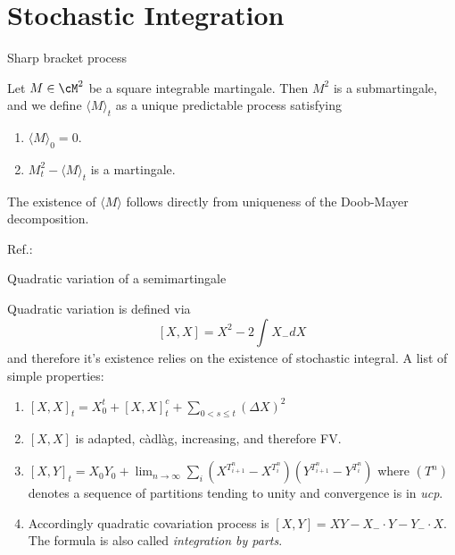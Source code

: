 

\section{Stochastic Integration}


\begin{frame}
    {Sharp bracket process}
    
    Let $M \in \cM^2$ be a square integrable martingale. Then $M^2$ is
    a submartingale, and we define $\langle M \rangle_t$ as a unique predictable
    process satisfying
    \begin{enumerate}
        \item $\langle M \rangle_0 = 0$.
        \item $M^2_t - \langle M \rangle_t$ is a martingale.
    \end{enumerate}
    The existence of $\langle  M \rangle$ follows directly from uniqueness of the
    Doob-Mayer decomposition.

    \vfill

    Ref.: %
\end{frame}


\begin{frame}
    {Quadratic variation of a semimartingale}

    Quadratic variation is defined via
    \begin{equation}
        \left[ X,X \right] = X^2 -2 \int_{}^{} X_{-} dX
    \end{equation}
    and therefore it's existence relies on the existence of stochastic integral.
    A list of simple properties:
    \begin{enumerate}
        \item $\left[ X,X \right]_t = X_0^t + \left[ X,X \right]^c_t +
            \sum_{0<s\leq t} (\Delta X)^2$
        \item $\left[ X,X \right]$ is adapted, c\`adl\`ag, increasing, and
            therefore FV.
        \item $\left[ X,Y \right]_t = X_0 Y_0 + \lim_{n\to \infty} \sum_{i}
            \left( X^{T_{i+1}^n} - X^{T_{i}^n} \right)  \left( Y^{T_{i+1}^n} -
            Y^{T_{i}^n} \right)$ where $\left( T^n \right)$ denotes a sequence
            of partitions tending to unity and convergence is in \emph{ucp}.
        \item Accordingly quadratic covariation process is $\left[ X,Y \right]=
            XY - X_{-}\cdot Y-Y_{-}\cdot X$. The formula is also called
            \emph{integration by parts}.
    \end{enumerate}
    
\end{frame}


